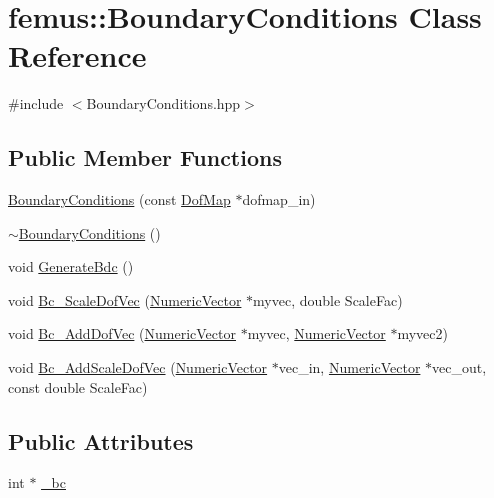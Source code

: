 \hypertarget{classfemus_1_1_boundary_conditions}{}\section{femus\+:\+:Boundary\+Conditions Class Reference}
\label{classfemus_1_1_boundary_conditions}


{\ttfamily \#include $<$Boundary\+Conditions.\+hpp$>$}

\subsection*{Public Member Functions}
\begin{DoxyCompactItemize}
\item 
\mbox{\hyperlink{classfemus_1_1_boundary_conditions_a3815a499a7c1dd6193e27507b20148e6}{Boundary\+Conditions}} (const \mbox{\hyperlink{classfemus_1_1_dof_map}{Dof\+Map}} $\ast$dofmap\+\_\+in)
\item 
\mbox{\hyperlink{classfemus_1_1_boundary_conditions_ae2202e496079efde43075f7401635734}{$\sim$\+Boundary\+Conditions}} ()
\item 
void \mbox{\hyperlink{classfemus_1_1_boundary_conditions_a8dd3678ce76bb1723e03deca11e273ae}{Generate\+Bdc}} ()
\item 
void \mbox{\hyperlink{classfemus_1_1_boundary_conditions_a72672b4fab37f53c790f3d6e4414dc9a}{Bc\+\_\+\+Scale\+Dof\+Vec}} (\mbox{\hyperlink{classfemus_1_1_numeric_vector}{Numeric\+Vector}} $\ast$myvec, double Scale\+Fac)
\item 
void \mbox{\hyperlink{classfemus_1_1_boundary_conditions_ab14ae456da17603f71f0d1d3960cb18d}{Bc\+\_\+\+Add\+Dof\+Vec}} (\mbox{\hyperlink{classfemus_1_1_numeric_vector}{Numeric\+Vector}} $\ast$myvec, \mbox{\hyperlink{classfemus_1_1_numeric_vector}{Numeric\+Vector}} $\ast$myvec2)
\item 
void \mbox{\hyperlink{classfemus_1_1_boundary_conditions_a214920d556d9716237f392bb1d1ab316}{Bc\+\_\+\+Add\+Scale\+Dof\+Vec}} (\mbox{\hyperlink{classfemus_1_1_numeric_vector}{Numeric\+Vector}} $\ast$vec\+\_\+in, \mbox{\hyperlink{classfemus_1_1_numeric_vector}{Numeric\+Vector}} $\ast$vec\+\_\+out, const double Scale\+Fac)
\end{DoxyCompactItemize}
\subsection*{Public Attributes}
\begin{DoxyCompactItemize}
\item 
int $\ast$ \mbox{\hyperlink{classfemus_1_1_boundary_conditions_ad269ae59ac9ff09c60e1d6a6958f1811}{\+\_\+bc}}
\end{DoxyCompactItemize}


